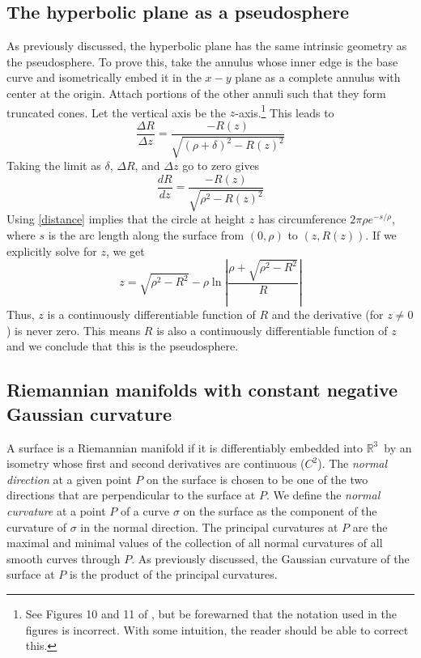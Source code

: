 \documentclass[letterpaper,titlepage]{article}
\newcommand{\esp}{$\mathbb{R}^3$}
\begin{document}
\subsection{The hyperbolic plane as a pseudosphere}
As previously discussed, the hyperbolic plane has the same intrinsic geometry as the pseudosphere.
To prove this, take the annulus whose inner edge is the base curve and isometrically embed it in the $x-y$ plane as a complete annulus with center at the origin.
Attach portions of the other annuli such that they form truncated cones.
Let the vertical axis be the $z$-axis.\footnote{See Figures 10 and 11 of \cite{crochetplane}, but be forewarned that the notation used in the figures is incorrect. With some intuition, the reader should be able to correct this.}
This leads to
\begin{equation}
\frac{\Delta R}{\Delta z} = \frac{-R(z)}{\sqrt{ \left(\rho+\delta\right)^2 - R(z)^2 }}
\end{equation}
Taking the limit as $\delta$, $\Delta R$, and $\Delta z$ go to zero gives
\begin{equation}
\frac{dR}{dz} = \frac{-R(z)}{\sqrt{\rho^2 - R(z)^2}}
\label{drdz}
\end{equation}
Using \eqref{distance} implies that the circle at height $z$ has circumference $2\pi \rho e^{-s/\rho}$, where $s$ is the arc length along the surface from $(0,\rho)$ to $(z,R(z))$.
If we explicitly solve for $z$, we get
\begin{equation}
z = \sqrt{\rho^2 - R^2} - \rho \ln \left| \frac{\rho + \sqrt{\rho^2 - R^2}}{R} \right|
\end{equation}
Thus, $z$ is a continuously differentiable function of $R$ and the derivative (for $z \not= 0$) is never zero.
This means $R$ is also a continuously differentiable function of $z$ and we conclude that this is the pseudosphere.\cite{crochetplane}

\subsection{Riemannian manifolds with constant negative Gaussian curvature}
A surface is a Riemannian manifold if it is differentiably embedded into \esp ~by an isometry whose first and second derivatives are continuous ($C^2$).
The \emph{normal direction} at a given point $P$ on the surface is chosen to be one of the two directions that are perpendicular to the surface at $P$.
We define the \emph{normal curvature} at a point $P$ of a curve $\sigma$ on the surface as the component of the curvature of $\sigma$ in the normal direction.
The principal curvatures at $P$ are the maximal and minimal values of the collection of all normal curvatures of all smooth curves through $P$.
As previously discussed, the Gaussian curvature of the surface at $P$ is the product of the principal curvatures.
\end{document}
